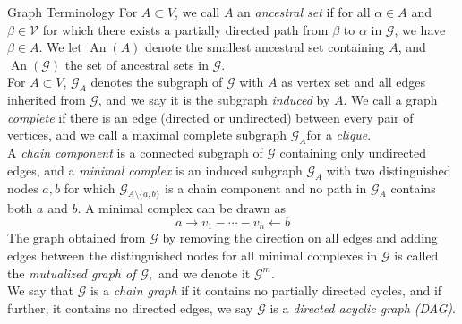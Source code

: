 \documentclass[11pt, a4paper]{memoir}
\theoremstyle{break}
\theoremstyle{break}
\theoremstyle{nonumberplain}
\DeclareMathOperator{\an}{An}
\begin{document}
\begin{mydefinition}{Graph Terminology}
For $A\subset V$, we call $A$ an \emph{ancestral set} if for all $\alpha\in A$ and  $\beta \in \mathcal{V}$ for which there exists a partially directed path from $\beta$ to $\alpha$ in $\mathcal{G}$, we have $\beta \in A$. We let $\an(A)$ denote the smallest ancestral set containing $A$, and $\an(\mathcal{G})$ the set of ancestral sets in $\mathcal{G}$.\\[5pt]
For $A\subset V$, $\mathcal{G}_A$ denotes the subgraph of $\mathcal{G}$ with $A$ as vertex set and all edges inherited from $\mathcal{G}$, and we say it is the subgraph \emph{induced} by $A$. We call a graph \emph{complete} if there is an edge (directed or undirected) between every pair of vertices, and we call a maximal complete subgraph $\mathcal{G}_A$for a \emph{clique}.\\[5pt]
A \emph{chain component} is a connected subgraph of $\mathcal{G}$ containing only undirected edges, and a \emph{minimal complex}  is an induced subgraph $\mathcal{G}_A$ with two distinguished nodes $a,b$ for which $\mathcal{G}_{A\setminus \{a,b\}}$ is a chain component and no path in $\mathcal{G}_A$ contains both $a$ and $b$. A minimal complex can be drawn as
$$a\to v_1-\cdots-v_n\gets b$$
The graph obtained from $\mathcal{G}$ by removing the direction on all edges and adding edges between the distinguished nodes for all minimal complexes in $\mathcal{G}$ is called the \emph{mutualized graph of $\mathcal{G}$},\footnotemark\ and we denote it $\mathcal{G}^m$.\\[5pt]
We say that $\mathcal{G}$ is a \emph{chain graph} if it contains no partially directed cycles, and if further, it contains no directed edges, we say $\mathcal{G}$ is a \emph{directed acyclic graph (DAG)}.
\end{mydefinition}
\end{document}

